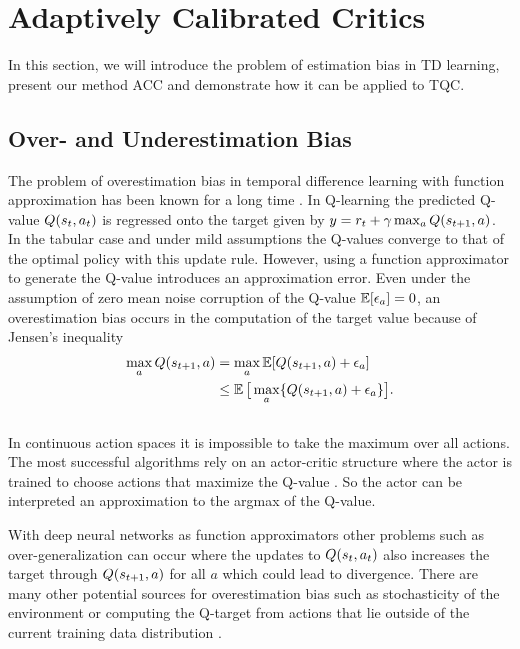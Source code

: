 \section{Adaptively Calibrated Critics }

In this section, we will introduce the problem of estimation bias in TD learning, present our method ACC and demonstrate how it can be applied to TQC.

\subsection{Over- and Underestimation Bias}


The problem of overestimation bias in temporal difference learning with function approximation has been known for a long time \cite{Thrun+Schwartz:1993}.
In Q-learning \cite{watkins1992q} the predicted Q-value $Q(s_t,a_t)$ is regressed onto the target given by $y = r_t + \gamma \max_a Q(s_{t+1}, a)$.
In the tabular case and under mild assumptions the Q-values converge to that of the optimal policy \cite{watkins1992q} with this update rule. However, using a function approximator to generate the Q-value introduces an approximation error.
Even under the assumption of zero mean noise corruption of the Q-value
$\operatorname*{\mathbb{E}}[\epsilon_a] = 0$,  an overestimation bias occurs in the computation of the target value because of Jensen's inequality
\vspace{-0.2cm}
\begin{align}
    \max_a Q(\stone, a) &= \max_a \E [ Q(\stone, a) + \epsilon_a] \nonumber \\
    & \leq \E \big[\max_a \{Q(\stone, a) + \epsilon_a\} \big] .
    \vspace{-0.9cm}
\end{align}\\[-0.5cm]
In continuous action spaces it is impossible to take the maximum over all actions. The most successful algorithms rely on an actor-critic structure where the actor is trained to choose actions that maximize the Q-value \cite{td3,SAC,ddpg}. So the actor can be interpreted an approximation to the argmax of the Q-value.

With deep neural networks as function approximators other problems such as over-generalization \cite{dqn15,NIPS17-ishand} can occur where the updates to $Q(s_t,a_t)$ also increases the target through $Q(s_{t+1},a)$ for all $a$ which could lead to divergence.
There are many other potential sources for overestimation bias such as  stochasticity of the environment 
 \cite{hasselt2010double} or computing the Q-target from actions that lie outside of the current training data distribution \cite{kumarStabilizing19}.


